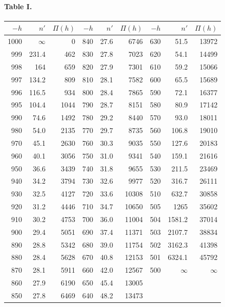 \documentclass[11pt,a4paper]{article}
\begin{document}
\paragraph*{Table I.}

\begin{center}
\begin{tabular}{|r|r|r||r|r|r||r|r|r|}
\hline
$-h$ & $n'$ & $\Pi(h)$ & $-h$ & $n'$ & $\Pi(h)$ & $-h$ & $n'$ & $\Pi(h)$ \\\hline
1000 & $\infty$ & 0 & 840 & 27.6 & 6746 & 630 & 51.5 & 13972 \\
999 & 231.4 & 462 & 830 & 27.8 & 7023 & 620 & 54.1 & 14499 \\
998 & 164 & 659 & 820 & 27.9 & 7301 & 610 & 59.2 & 15066 \\
997 & 134.2 & 809 & 810 & 28.1 & 7582 & 600 & 65.5 & 15689 \\
996 & 116.5 & 934 & 800 & 28.4 & 7865 & 590 & 72.1 & 16377 \\
995 & 104.4 & 1044 & 790 & 28.7 & 8151 & 580 & 80.9 & 17142 \\
990 & 74.6 & 1492 & 780 & 29.2 & 8440 & 570 & 93.0 & 18011 \\
980 & 54.0 & 2135 & 770 & 29.7 & 8735 & 560 & 106.8 & 19010 \\
970 & 45.1 & 2630 & 760 & 30.3 & 9035 & 550 & 127.6 & 20183 \\
960 & 40.1 & 3056 & 750 & 31.0 & 9341 & 540 & 159.1 & 21616 \\
950 & 36.6 & 3439 & 740 & 31.8 & 9655 & 530 & 211.5 & 23469 \\
940 & 34.2 & 3794 & 730 & 32.6 & 9977 & 520 & 316.7 & 26111 \\
930 & 32.5 & 4127 & 720 & 33.6 & 10308 & 510 & 632.7 & 30858 \\
920 & 31.2 & 4446 & 710 & 34.7 & 10650 & 505 & 1265 & 35602 \\
910 & 30.2 & 4753 & 700 & 36.0 & 11004 & 504 & 1581.2 & 37014 \\
900 & 29.4 & 5051 & 690 & 37.4 & 11371 & 503 & 2107.7 & 38834 \\
890 & 28.8 & 5342 & 680 & 39.0 & 11754 & 502 & 3162.3 & 41398 \\
880 & 28.4 & 5628 & 670 & 40.8 & 12153 & 501 & 6324.1 & 45792 \\
870 & 28.1 & 5911 & 660 & 42.0 & 12567 & 500 & $\infty$ & $\infty$ \\
860 & 27.9 & 6190 & 650 & 45.4 & 13005 & & & \\
850 & 27.8 & 6469 & 640 & 48.2 & 13473 & & & \\
\hline
\end{tabular}
\end{center}
\end{document}

